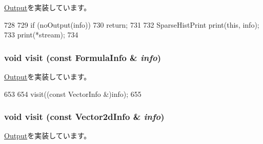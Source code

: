 \hyperlink{structStats_1_1Output_acab7797e495fae2af2e7a37cc9b5b0ce}{Output}を実装しています。


\begin{DoxyCode}
728 {
729     if (noOutput(info))
730         return;
731 
732     SparseHistPrint print(this, info);
733     print(*stream);
734 }
\end{DoxyCode}
\hypertarget{classStats_1_1Text_ad5ec5d0ac0a339061e845a2cb0232164}{
\subsubsection[{visit}]{\setlength{\rightskip}{0pt plus 5cm}void visit (const {\bf FormulaInfo} \& {\em info})}}
\label{classStats_1_1Text_ad5ec5d0ac0a339061e845a2cb0232164}


\hyperlink{structStats_1_1Output_aee6a314df4bef5e9f26fdefb884620f5}{Output}を実装しています。


\begin{DoxyCode}
653 {
654     visit((const VectorInfo &)info);
655 }
\end{DoxyCode}
\hypertarget{classStats_1_1Text_a2aae6a3b530f999b3d2bdd1882643e72}{
\subsubsection[{visit}]{\setlength{\rightskip}{0pt plus 5cm}void visit (const {\bf Vector2dInfo} \& {\em info})}}
\label{classStats_1_1Text_a2aae6a3b530f999b3d2bdd1882643e72}


\hyperlink{structStats_1_1Output_ae8993423f40b8eca4bd2b1edf4670489}{Output}を実装しています。


